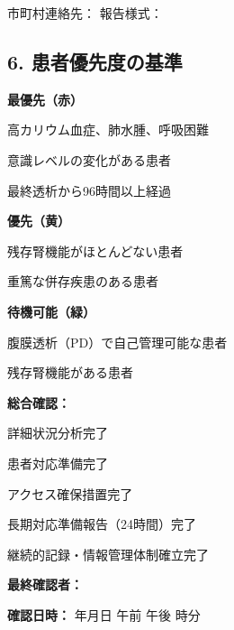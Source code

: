 \documentclass[
  japanese,
  letterpaper,
  DIV=11,
  numbers=noendperiod]{scrartcl}
\begin{document}
\quad 市町村連絡先：\underlinespace{8cm}
\quad 報告様式：\underlinespace{4cm}

\newpage

\subsection{6.
患者優先度の基準}\label{ux60a3ux8005ux512aux5148ux5ea6ux306eux57faux6e96}

\textbf{最優先（赤）}

\checkbox 高カリウム血症、肺水腫、呼吸困難

\checkbox 意識レベルの変化がある患者

\checkbox 最終透析から96時間以上経過

\vspace{5mm}

\textbf{優先（黄）}

\checkbox 残存腎機能がほとんどない患者

\checkbox 重篤な併存疾患のある患者

\vspace{5mm}

\textbf{待機可能（緑）}

\checkbox 腹膜透析（PD）で自己管理可能な患者

\checkbox 残存腎機能がある患者

\vspace{5mm}

\textbf{総合確認：}

\checkbox 詳細状況分析完了

\checkbox 患者対応準備完了

\checkbox アクセス確保措置完了

\checkbox 長期対応準備報告（24時間）完了

\checkbox 継続的記録・情報管理体制確立完了

\vspace{5mm}

\textbf{最終確認者：} \underlinespace{4cm}

\textbf{確認日時：}
\underlinespace{2cm}年\underlinespace{1cm}月\underlinespace{1cm}日
\quad \circlecheck 午前 \quad \circlecheck 午後
\quad \underlinespace{1cm}時\underlinespace{1cm}分
\end{document}

